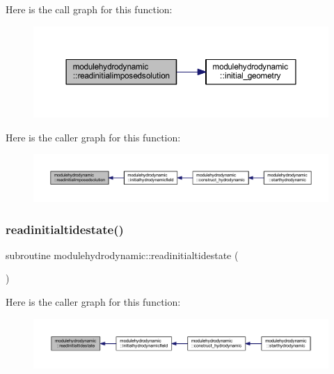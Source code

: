 Here is the call graph for this function\+:\nopagebreak
\begin{figure}[H]
\begin{center}
\leavevmode
\includegraphics[width=350pt]{namespacemodulehydrodynamic_a8c1095168f036a4615b7ef4ad633717b_cgraph}
\end{center}
\end{figure}
Here is the caller graph for this function\+:\nopagebreak
\begin{figure}[H]
\begin{center}
\leavevmode
\includegraphics[width=350pt]{namespacemodulehydrodynamic_a8c1095168f036a4615b7ef4ad633717b_icgraph}
\end{center}
\end{figure}
\mbox{\label{namespacemodulehydrodynamic_ac4bc667c44ab1d14eaa3efa39b224aa1}} 
\subsubsection{\texorpdfstring{readinitialtidestate()}{readinitialtidestate()}}
{\footnotesize\ttfamily subroutine modulehydrodynamic\+::readinitialtidestate (\begin{DoxyParamCaption}{ }\end{DoxyParamCaption})\hspace{0.3cm}{\ttfamily [private]}}

Here is the caller graph for this function\+:\nopagebreak
\begin{figure}[H]
\begin{center}
\leavevmode
\includegraphics[width=350pt]{namespacemodulehydrodynamic_ac4bc667c44ab1d14eaa3efa39b224aa1_icgraph}
\end{center}
\end{figure}
\mbox{\label{namespacemodulehydrodynamic_a52fe0c61446c7eca188bf5a42867951b}} 
